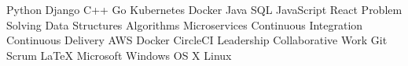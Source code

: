 
\begin{cvparagraph}

Python{\dotsep}
Django{\dotsep}
C++{\dotsep}
Go{\dotsep}
Kubernetes{\dotsep}
Docker{\dotsep}
Java{\dotsep}
SQL{\dotsep}
JavaScript{\dotsep}
React{\dotsep}
Problem Solving{\dotsep}
Data Structures{\dotsep}
Algorithms{\dotsep}
Microservices{\dotsep}
Continuous Integration{\dotsep}
Continuous Delivery{\dotsep}
AWS{\dotsep}
Docker{\dotsep}
CircleCI{\dotsep}
Leadership{\dotsep}
Collaborative Work{\dotsep}
Git{\dotsep}
Scrum{\dotsep}
\LaTeX{\dotsep}
Microsoft Windows{\dotsep}
OS X{\dotsep}
Linux
\end{cvparagraph}
